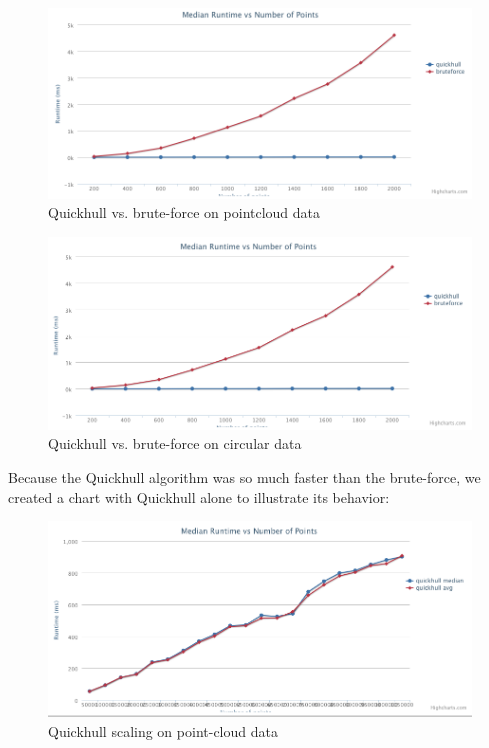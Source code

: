 \documentclass[11pt]{article}
\begin{document}
\begin{figure}
	\caption{Quickhull vs. brute-force on pointcloud data}
	\centering
	\includegraphics[scale=0.3]{qh-v-bf-cloud.png} 
\end{figure}

\begin{figure}
	\caption{Quickhull vs. brute-force on circular data}
	\centering
	\includegraphics[scale=0.3]{qh-v-bf-circle.png} 
\end{figure}

Because the Quickhull algorithm was so much faster than the brute-force, we created a chart with Quickhull alone to illustrate its behavior:

\begin{figure}
	\caption{Quickhull scaling on point-cloud data}
	\centering
	\includegraphics[scale=0.3]{qh-only.png} 
\end{figure}
\end{document}
